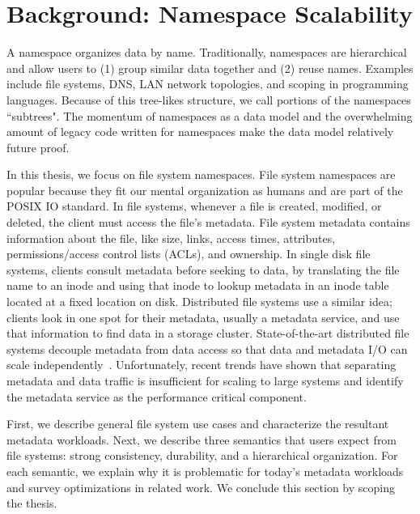 \chapter{Background: Namespace Scalability}
\label{chp:related-work}

A namespace organizes data by name. Traditionally, namespaces are hierarchical
and allow users to (1) group similar data together and (2) reuse names.
Examples include file systems, DNS, LAN network topologies, and scoping in
programming languages.  Because of this tree-likes structure, we call portions
of the namespaces ``subtrees".  The momentum of namespaces as a data model and
the overwhelming amount of legacy code written for namespaces make the data
model relatively future proof.

In this thesis, we focus on file system namespaces.  File system namespaces are
popular because they fit our mental organization as humans and are part of the
POSIX IO standard.  In file systems, whenever a file is created, modified, or
deleted, the client must access the file's metadata. File system metadata
contains information about the file, like size, links, access times,
attributes, permissions/access control lists (ACLs), and ownership.  In single
disk file systems, clients consult metadata before seeking to data, by
translating the file name to an inode and using that inode to lookup metadata
in an inode table located at a fixed location on disk.  Distributed file
systems use a similar idea; clients look in one spot for their metadata,
usually a metadata service, and use that information to find data in a storage
cluster.  State-of-the-art distributed file systems decouple metadata from data
access so that data and metadata I/O can scale
independently~\cite{alam:pdsw2011-metadata-scaling, ghemawat:sosp2003-gfs,
hildebrand:msst2005-pnfs, weil:osdi2006-ceph, welch:fast2008-panasas,
xing:sc2009-skyfs}.  Unfortunately, recent trends have shown that separating
metadata and data traffic is insufficient for scaling to large systems and
identify the metadata service as the performance critical component.

First, we describe general file system use cases and
characterize the resultant metadata workloads. Next, we describe three
semantics that users expect from file systems: strong consistency, durability,
and a hierarchical organization.  For each semantic, we explain why it is
problematic for today's metadata workloads and survey optimizations in related
work. We conclude this section by scoping the thesis.

